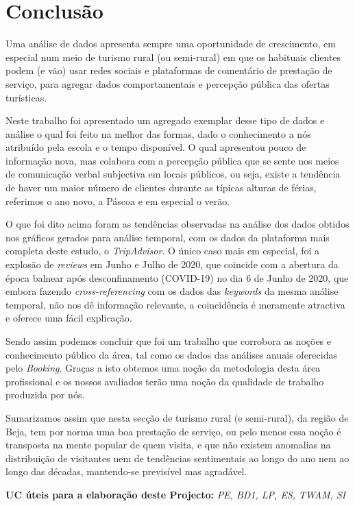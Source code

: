  \chapter{Conclusão}
\label{cap10}

Uma análise de dados apresenta sempre uma oportunidade de crescimento, em especial num meio de turismo rural (ou semi-rural) em que os habituais clientes podem (e vão) usar redes sociais e plataformas de comentário de prestação de serviço, para agregar dados comportamentais e percepção pública das ofertas turísticas.

Neste trabalho foi apresentado um agregado exemplar desse tipo de dados e análise o qual foi feito na melhor das formas, dado o conhecimento a nós atribuído pela escola e o tempo disponível. O qual apresentou pouco de informação nova, mas colabora com a percepção pública que se sente nos meios de comunicação verbal subjectiva em locais públicos, ou seja, existe a tendência de haver um maior número de clientes durante as típicas alturas de férias, referimos o ano novo, a Páscoa e em especial o verão.

O que foi dito acima foram as tendências observadas na análise dos dados obtidos nos gráficos gerados para análise temporal, com os dados da plataforma mais completa deste estudo, o \textit{TripAdvisor}. O único caso mais em especial, foi a explosão de \textit{reviews} em Junho e Julho de 2020, que coincide com a abertura da época balnear após desconfinamento (COVID-19) no dia 6 de Junho de 2020, que embora fazendo \textit{cross-referencing} com os dados das \textit{keywords} da mesma análise temporal, não nos dê informação relevante, a coincidência é meramente atractiva e oferece uma fácil explicação.

Sendo assim podemos concluir que foi um trabalho que corrobora as noções e conhecimento público da área, tal como os dados das análises anuais oferecidas pelo \textit{Booking}. Graças a isto obtemos uma noção da metodologia desta área profissional e os nossos avaliados terão uma noção da qualidade de trabalho produzida por nós.

Sumarizamos assim que nesta secção de turismo rural (e semi-rural), da região de Beja, tem por norma uma boa prestação de serviço, ou pelo menos essa noção é transposta na mente popular de quem visita, e que não existem anomalias na distribuição de visitantes nem de tendências sentimentais ao longo do ano nem ao longo das décadas, mantendo-se previsível mas agradável.

\textbf{UC úteis para a elaboração deste Projecto:} \textit{PE, BD1, LP, ES, TWAM, SI}
